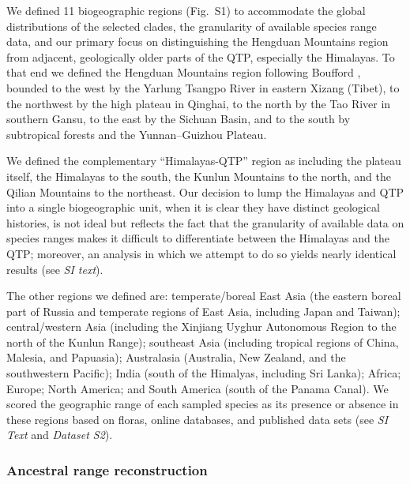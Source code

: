 We defined 11 biogeographic regions (Fig.~S1) to accommodate the
global distributions of the selected clades, the granularity of
available species range data, and our primary focus on distinguishing
the Hengduan Mountains region from adjacent, geologically older parts
of the QTP, especially the Himalayas. To that end we defined the
Hengduan Mountains region following Boufford \citep{Boufford2014},
bounded to the west by the Yarlung Tsangpo River in eastern Xizang
(Tibet), to the northwest by the high plateau in Qinghai, to the north
by the Tao River in southern Gansu, to the east by the Sichuan Basin,
and to the south by subtropical forests and the Yunnan–Guizhou
Plateau.

We defined the complementary ``Himalayas-QTP'' region as including the
plateau itself, the Himalayas to the south, the Kunlun Mountains to
the north, and the Qilian Mountains to the northeast. Our decision to
lump the Himalayas and QTP into a single biogeographic unit, when it
is clear they have distinct geological histories, is not ideal but
reflects the fact that the granularity of available data on species
ranges makes it difficult to differentiate between the Himalayas and
the QTP; moreover, an analysis in which we attempt to do so yields
nearly identical results (see \textit{SI text}).

The other regions we defined are: temperate/boreal East Asia (the
eastern boreal part of Russia and temperate regions of East Asia,
including Japan and Taiwan); central/western Asia (including the
Xinjiang Uyghur Autonomous Region to the north of the Kunlun Range);
southeast Asia (including tropical regions of China, Malesia, and
Papuasia); Australasia (Australia, New Zealand, and the southwestern
Pacific); India (south of the Himalyas, including Sri Lanka); Africa;
Europe; North America; and South America (south of the Panama
Canal). We scored the geographic range of each sampled species as its
presence or absence in these regions based on floras, online
databases, and published data sets (see \textit{SI Text} and
\textit{Dataset S2}).

\subsubsection*{Ancestral range reconstruction}

